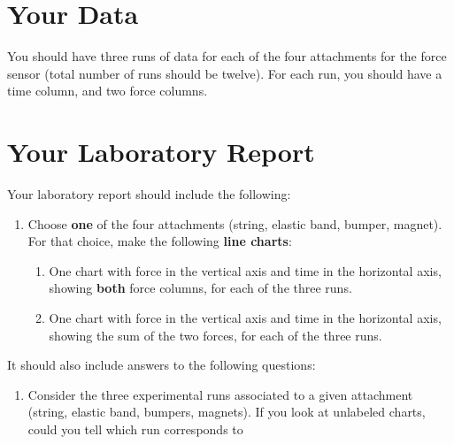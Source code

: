 \section{Your Data}
You should have three runs of data for each of the four attachments for the force sensor (total number of runs should be twelve). For each run, you should have a time column, and two force columns. 
\newpage
\section{Your Laboratory Report}
Your laboratory report should include the following:
\begin{enumerate}
    \item Choose \textbf{one} of the four attachments (string, elastic band, bumper, magnet). For that choice, make the following \textbf{line charts}:
    \begin{enumerate}
        \item One chart with force in the vertical axis and time in the horizontal axis, showing \textbf{both} force columns, for each of the three runs.
        \item One chart with force in the vertical axis and time in the horizontal axis, showing the sum of the two forces, for each of the three runs.
    \end{enumerate}
\end{enumerate}
It should also include answers to the following questions:
\begin{enumerate}
    \item Consider the three experimental runs associated to a given attachment (string, elastic band, bumpers, magnets). If you look at unlabeled charts, could you tell which run corresponds to 
\end{enumerate}
\newpage
